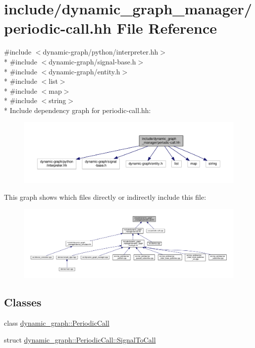 \hypertarget{periodic-call_8hh}{}\section{include/dynamic\+\_\+graph\+\_\+manager/periodic-\/call.hh File Reference}
\label{periodic-call_8hh}
{\ttfamily \#include $<$dynamic-\/graph/python/interpreter.\+hh$>$}\\*
{\ttfamily \#include $<$dynamic-\/graph/signal-\/base.\+h$>$}\\*
{\ttfamily \#include $<$dynamic-\/graph/entity.\+h$>$}\\*
{\ttfamily \#include $<$list$>$}\\*
{\ttfamily \#include $<$map$>$}\\*
{\ttfamily \#include $<$string$>$}\\*
Include dependency graph for periodic-\/call.hh\+:
\nopagebreak
\begin{figure}[H]
\begin{center}
\leavevmode
\includegraphics[width=350pt]{periodic-call_8hh__incl}
\end{center}
\end{figure}
This graph shows which files directly or indirectly include this file\+:
\nopagebreak
\begin{figure}[H]
\begin{center}
\leavevmode
\includegraphics[width=350pt]{periodic-call_8hh__dep__incl}
\end{center}
\end{figure}
\subsection*{Classes}
\begin{DoxyCompactItemize}
\item 
class \hyperlink{classdynamic__graph_1_1PeriodicCall}{dynamic\+\_\+graph\+::\+Periodic\+Call}
\item 
struct \hyperlink{structdynamic__graph_1_1PeriodicCall_1_1SignalToCall}{dynamic\+\_\+graph\+::\+Periodic\+Call\+::\+Signal\+To\+Call}
\end{DoxyCompactItemize}
